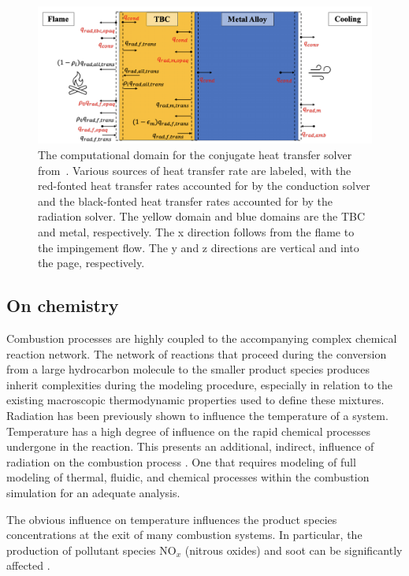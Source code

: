 \begin{figure}
\centering
\includegraphics[width=1\linewidth]{figures/ch2/TBC.png}
\caption{The computational domain for the conjugate heat transfer solver from~\cite{Tricard2021ModelingEnvironments.}. Various sources of heat transfer rate are labeled, with the red-fonted heat transfer rates accounted for by the conduction solver and the black-fonted heat transfer rates accounted for by the radiation solver. The yellow domain and blue domains are the TBC and metal, respectively. The x direction follows from the flame to the impingement flow. The y and z directions are vertical and into the page, respectively. }
\label{fig:TBC}
\end{figure}

\subsection{On chemistry}
Combustion processes are highly coupled to the accompanying complex chemical reaction network.
The network of reactions that proceed during the conversion from a large hydrocarbon molecule to the smaller product species produces inherit complexities during the modeling procedure, especially in relation to the existing macroscopic thermodynamic properties used to define these mixtures.
Radiation has been previously shown to influence the temperature of a system. Temperature has a high degree of influence on the rapid chemical processes undergone in the reaction.
This presents an additional, indirect, influence of radiation on the combustion process . One that requires modeling of full modeling of thermal, fluidic, and chemical processes within the combustion simulation for an adequate analysis.

The obvious influence on temperature influences the product species concentrations at the exit of many combustion systems. In particular, the production of pollutant species NO$_x$ (nitrous oxides) and soot can be significantly affected \cite{Viskanta2010RadiativeSystems}.

